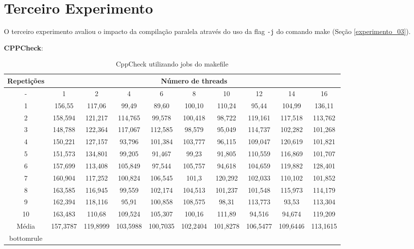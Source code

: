\section{Terceiro Experimento}

O terceiro experimento avaliou o impacto da compilação
 paralela através do uso da flag \texttt{-j} do
 comando make (Seção \ref{experimento_03}).



\textbf{CPPCheck}:


\begin{table}[h]
\centering
\caption{CppCheck utilizando jobs do makefile}
\label{tab:cppcheck}
\begin{tiny}
\begin{tabular}{cccccccccc}
\toprule
\textbf{Repetições} & \multicolumn{9}{c}{\textbf{Número de threads}} \\ \midrule
- & 1 & 2 & 4 & 6 & 8 & 10 & 12 & 14 & 16 \\ 
1 & 156,55  &  117,06  &  99,49   &  89,60    & 100,10   & 110,24  & 95,44     & 104,99   & 136,11 \\ 
2 & 158,594 &  121,217 &  114,765 &  99,578   & 100,418  & 98,722  & 119,161   & 117,518  & 113,762 \\ 
3 & 148,788 &  122,364 &  117,067 &  112,585  & 98,579   & 95,049  & 114,737   & 102,282  & 101,268 \\ 
4 & 150,221 &  127,157 &  93,796  &  101,384  & 103,777  & 96,115  & 109,047   & 120,619  & 101,821 \\ 
5 & 151,573 &  134,801 &  99,205  &  91,467   & 99,23    & 91,805  & 110,559   & 116,869  & 101,707 \\ 
6 & 157,699 &  113,408 &  105,849 &  97,544   & 105,757  & 94,618  & 104,659   & 119,882  & 128,401 \\ 
7 & 160,904 &  117,252 &  100,824 &  106,545  & 101,3    & 120,292 & 102,033   & 110,102  & 101,852 \\ 
8 & 163,585 &  116,945 &  99,559  &  102,174  & 104,513  & 101,237 & 101,548   & 115,973  & 114,179 \\ 
9 & 162,394 &  118,116 &  95,91   &  100,858  & 108,575  & 98,31   & 113,773   & 93,53    & 113,304 \\ 
10& 163,483 &  110,68  &  109,524 &  105,307  & 100,16   & 111,89  & 94,516    & 94,674   & 119,209 \\ \midrule
Média& 157,3787&  119,8999&  103,5988&  100,7035 & 102,2404 & 101,8278&  106,5477 & 109,6446 & 113,1615 \\bottomrule 
\end{tabular}
\end{tiny}
\end{table}


